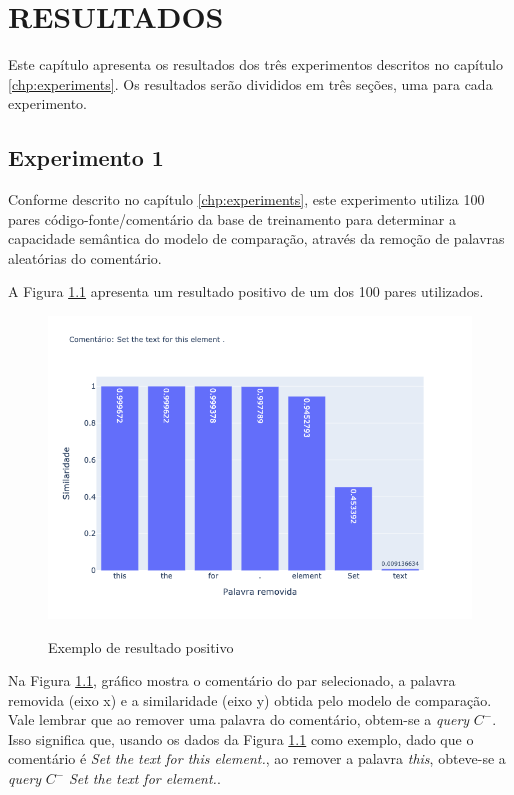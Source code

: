 \chapter{RESULTADOS}
\label{chp:results}

Este capítulo apresenta os resultados dos três experimentos descritos no capítulo \ref{chp:experiments}. Os resultados serão divididos em três seções, uma para cada experimento.

\section{Experimento 1} 
\label{sec:results:experiment-1}

Conforme descrito no capítulo \ref{chp:experiments}, este experimento utiliza 100 pares código-fonte/comentário da base de treinamento para determinar a capacidade semântica do modelo de comparação, através da remoção de palavras aleatórias do comentário.

A Figura \ref{fig:experiment-1:good} apresenta um resultado positivo de um dos 100 pares utilizados.
\begin{figure}[H]
  \centering
    \caption{Exemplo de resultado positivo}
    \includegraphics[scale=0.6]{imagens/resultados/experiment-1/sample_5.png}
    \label{fig:experiment-1:good}
\end{figure}

Na Figura \ref{fig:experiment-1:good}, gráfico mostra o comentário do par selecionado, a palavra removida (eixo x) e a similaridade (eixo y) obtida pelo modelo de comparação. Vale lembrar que ao remover uma palavra do comentário, obtem-se a \textit{query} $C^-$. Isso significa que, usando os dados da Figura \ref{fig:experiment-1:good} como exemplo, dado que o comentário é \textit{Set the text for this element.}, ao remover a palavra \textit{this}, obteve-se a \textit{query} $C^-$ \textit{Set the text for element.}.

